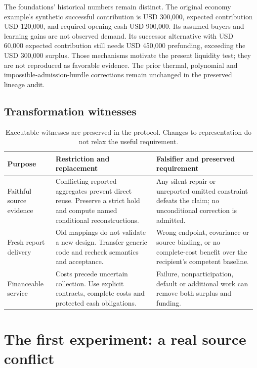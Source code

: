 The foundations' historical numbers remain distinct. The original economy example's synthetic successful contribution is USD 300,000, expected contribution USD 120,000, and required opening cash USD 900,000. Its assumed buyers and learning gains are not observed demand. Its successor alternative with USD 60,000 expected contribution still needs USD 450,000 prefunding, exceeding the USD 300,000 surplus. Those mechanisms motivate the present liquidity test; they are not reproduced as favorable evidence. The prior thermal, polynomial and impossible-admission-hurdle corrections remain unchanged in the preserved lineage audit.

\subsection{Transformation witnesses}

\begin{table}[H]\centering\small
\begin{tabularx}{\textwidth}{p{}YY}
\toprule Purpose & Restriction and replacement & Falsifier and preserved requirement\\\midrule
Faithful source evidence & Conflicting reported aggregates prevent direct reuse. Preserve a strict hold and compute named conditional reconstructions. & Any silent repair or unreported omitted constraint defeats the claim; no unconditional correction is admitted.\\
Fresh report delivery & Old mappings do not validate a new design. Transfer generic code and recheck semantics and acceptance. & Wrong endpoint, covariance or source binding, or no complete-cost benefit over the recipient's competent baseline.\\
Financeable service & Costs precede uncertain collection. Use explicit contracts, complete costs and protected cash obligations. & Failure, nonparticipation, default or additional work can remove both surplus and funding.\\\bottomrule
\end{tabularx}
\caption{Executable witnesses are preserved in the protocol. Changes to representation do not relax the useful requirement.}
\end{table}

\section{The first experiment: a real source conflict}

